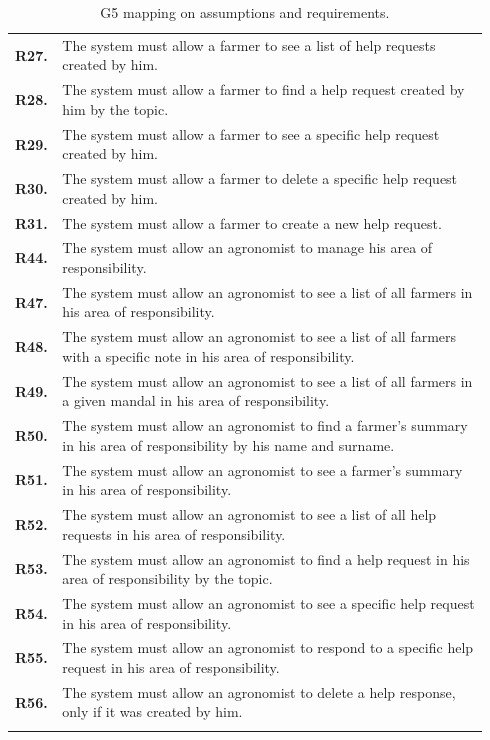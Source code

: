 \begin{longtable}{p{0.06\linewidth} p{0.88\linewidth}}
	\textbf{R27.} & The system must allow a farmer to see a list of help requests created by him.\\
	\textbf{R28.} & The system must allow a farmer to find a help request created by him by the topic.\\
	\textbf{R29.} & The system must allow a farmer to see a specific help request created by him.\\
	\textbf{R30.} & The system must allow a farmer to delete a specific help request created by him.\\
	\textbf{R31.} & The system must allow a farmer to create a new help request.\\
	
	\textbf{R44.} & The system must allow an agronomist to manage his area of responsibility.\\
	\textbf{R47.} & The system must allow an agronomist to see a list of all farmers in his area of responsibility.\\
	\textbf{R48.} & The system must allow an agronomist to see a list of all farmers with a specific note in his area of responsibility.\\
	\textbf{R49.} & The system must allow an agronomist to see a list of all farmers in a given mandal in his area of responsibility.\\
	\textbf{R50.} & The system must allow an agronomist to find a farmer's summary in his area of responsibility by his name and surname.\\
	\textbf{R51.} & The system must allow an agronomist to see a farmer's summary in his area of responsibility.\\
	\textbf{R52.} & The system must allow an agronomist to see a list of all help requests in his area of responsibility.\\
	\textbf{R53.} & The system must allow an agronomist to find a help request in his area of responsibility by the topic.\\
	\textbf{R54.} & The system must allow an agronomist to see a specific help request in his area of responsibility.\\
	\textbf{R55.} & The system must allow an agronomist to respond to a specific help request in his area of responsibility.\\
	\textbf{R56.} & The system must allow an agronomist to delete a help response, only if it was created by him.\\

    \bottomrule
    \caption{G5 mapping on assumptions and requirements.}
\end{longtable}

